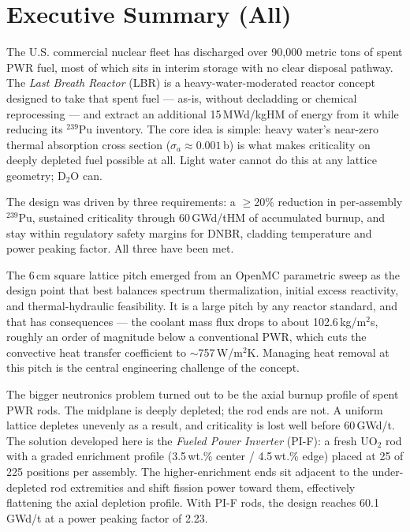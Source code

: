 \documentclass[12pt]{article}
\numberwithin{equation}{section}
\begin{document}
\clearpage
\section*{Executive Summary (All)}

The U.S. commercial nuclear fleet has discharged over 90,000 metric tons of spent PWR fuel, most of which sits in interim storage with no clear disposal pathway. The \textit{Last Breath Reactor} (LBR) is a heavy-water-moderated reactor concept designed to take that spent fuel --- as-is, without decladding or chemical reprocessing --- and extract an additional 15\,MWd/kgHM of energy from it while reducing its $^{239}$Pu inventory. The core idea is simple: heavy water's near-zero thermal absorption cross section ($\sigma_a \approx 0.001$\,b) is what makes criticality on deeply depleted fuel possible at all. Light water cannot do this at any lattice geometry; D$_2$O can.

The design was driven by three requirements: a $\geq$20\% reduction in per-assembly $^{239}$Pu, sustained criticality through 60\,GWd/tHM of accumulated burnup, and stay within regulatory safety margins for DNBR, cladding temperature and power peaking factor. All three have been met.

The 6\,cm square lattice pitch emerged from an OpenMC parametric sweep as the design point that best balances spectrum thermalization, initial excess reactivity, and thermal-hydraulic feasibility. It is a large pitch by any reactor standard, and that has consequences --- the coolant mass flux drops to about 102.6\,kg/m$^2$s, roughly an order of magnitude below a conventional PWR, which cuts the convective heat transfer coefficient to $\sim$757\,W/m$^2$K. Managing heat removal at this pitch is the central engineering challenge of the concept.

The bigger neutronics problem turned out to be the axial burnup profile of spent PWR rods. The midplane is deeply depleted; the rod ends are not. A uniform lattice depletes unevenly as a result, and criticality is lost well before 60\,GWd/t. The solution developed here is the \textit{Fueled Power Inverter} (PI-F): a fresh UO$_2$ rod with a graded enrichment profile (3.5\,wt.\% center / 4.5\,wt.\% edge) placed at 25 of 225 positions per assembly. The higher-enrichment ends sit adjacent to the under-depleted rod extremities and shift fission power toward them, effectively flattening the axial depletion profile. With PI-F rods, the design reaches 60.1\,GWd/t at a power peaking factor of 2.23.
\end{document}

